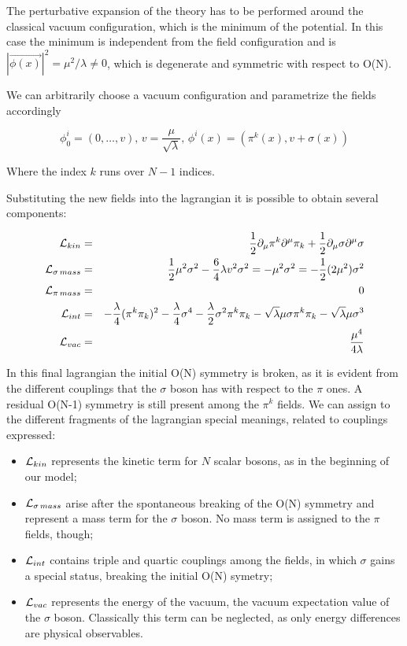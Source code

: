 The perturbative expansion of the theory has to be performed around the classical vacuum configuration, which is the minimum of the potential. In this case the minimum is independent from the field configuration and is $|\vec{\phi(x)}|^2 = \mu^2 / \lambda \neq 0$, which is degenerate and symmetric with respect to O(N).

We can arbitrarily choose a vacuum configuration and parametrize the fields accordingly

\begin{equation}
\phi_0^i = (0, \ldots, v), \, v= \dfrac{\mu}{\sqrt{\lambda}}, \, \phi^i(x) = (\pi^k(x), v + \sigma(x))
\end{equation}

Where the index $k$ runs over $N-1$ indices. 

Substituting the new fields into the lagrangian it is possible to obtain several components:

\begin{eqnarray}
\mathcal{L}_{kin} &=& \dfrac{1}{2} \partial_\mu \pi^k \partial^\mu \pi_k + \dfrac{1}{2}  \partial_\mu \sigma \partial^\mu \sigma \nonumber \\
\mathcal{L}_{\sigma \, mass} &=& \dfrac{1}{2} \mu^2 \sigma^2 - \dfrac{6}{4} \lambda v^2 \sigma^2 = - \mu^2 \sigma^2 = -\dfrac{1}{2} (2\mu^2) \sigma^2 \nonumber \\
\mathcal{L}_{\pi \, mass} &=& 0 \nonumber \\
\mathcal{L}_{int} &=& - \dfrac{\lambda}{4} (\pi^k\pi_k)^2 - \dfrac{\lambda}{4} \sigma^4 - \dfrac{\lambda}{2} \sigma^2 \pi^k \pi_k - \sqrt{\lambda} \mu \sigma \pi^k \pi_k - \sqrt{\lambda} \mu \sigma^3 \nonumber \\
\mathcal{L}_{vac} &=& \dfrac{\mu^4}{4\lambda} 
\end{eqnarray}

In this final lagrangian the initial O(N) symmetry is broken, as it is evident from the different couplings that the $\sigma$ boson has with respect to the $\pi$ ones. A residual O(N-1) symmetry is still present among the $\pi^k$ fields.
We can assign to the different fragments of the lagrangian special meanings, related to couplings expressed:
\begin{itemize}
\item $\mathcal{L}_{kin}$ represents the kinetic term for $N$ scalar bosons, as in the beginning of our model;
\item $\mathcal{L}_{\sigma \, mass}$ arise after the spontaneous breaking of the O(N) symmetry and represent a mass term for the $\sigma$ boson. No mass term is assigned to the $\pi$ fields, though;
\item $\mathcal{L}_{int}$ contains triple and quartic couplings among the fields, in which $\sigma$ gains a special status, breaking the initial O(N) symetry;
\item $\mathcal{L}_{vac}$ represents the energy of the vacuum, the vacuum expectation value of the $\sigma$ boson. Classically this term can be neglected, as only energy differences are physical observables.
\end{itemize}

